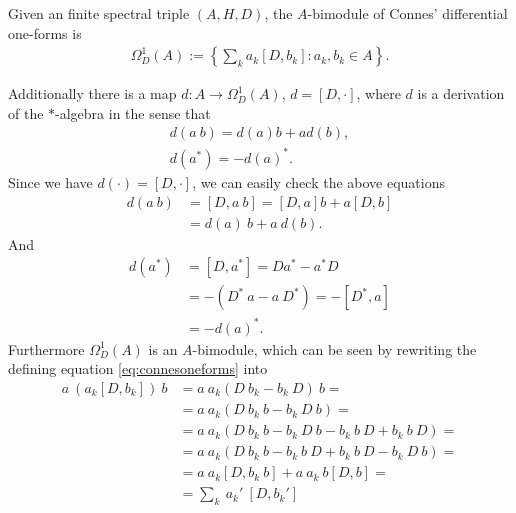 \begin{mydefinition}
    Given an finite spectral triple $(A, H, D)$, the $A$-bimodule of
    Connes' differential one-forms is
    \begin{align}\label{eq:connesoneforms}
        \Omega _D ^1 (A) := \left\{ \sum _k a_k[D, b_k]: a_k, b_k \in A
        \right\}.
    \end{align}
\end{mydefinition}
Additionally there is a map $d:A\rightarrow \Omega _D ^1 (A)$, $d = [D,
\cdot]$, where $d$ is a derivation of the $*$-algebra in the sense that
\begin{align}
    d(a\ b) = d(a)b + ad(b), \\
    d(a^*) = -d(a)^*.
\end{align}
Since we have $d(\cdot) = [D, \cdot]$, we can easily check the above equations
\begin{align}
    d(a\ b) &= [D, a\ b] = [D, a]b + a[D,b]\nonumber\\
    &= d(a)\ b + a\ d(b).
\end{align}
And
\begin{align}
    d(a^*) &= [D, a^*] = Da^* - a^*D \nonumber\\
    &=-(D^*\ a - a\ D^*) = -[D^*, a] \nonumber\\
    &= -d(a)^*.
\end{align}
Furthermore $\Omega _D^1 (A)$ is an $A$-bimodule, which can be seen by
rewriting the defining equation \eqref{eq:connesoneforms} into
\begin{align}
    a\ (a_k[D, b_k])\ b &= a\ a_k(D\ b_k - b_k\ D)\ b = \nonumber\\
       &= a\ a_k(D\ b_k\ b - b_k\ D\ b)=\nonumber\\
       &= a\ a_k(D\ b_k\ b - b_k\ D\ b - b_k\
       b\ D +b_k\ b\ D)=
       \nonumber\\
       &= a\ a_k(D\ b_k\ b-b_k\ b\ D + b_k\ b\ D - b_k\ D\ b) = \nonumber \\
       &= a\ a_k [D, b_k\ b] + a\ a_k\ b [D, b]=\nonumber\\
       &= \sum _k\ a_k'\ [D, b_k']
\end{align}


